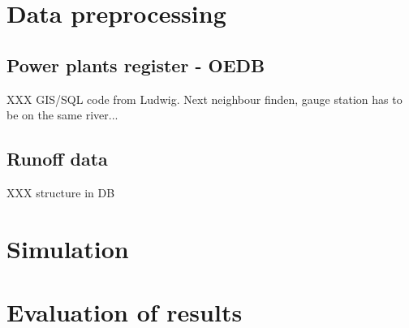\section{Data preprocessing}

\subsection{Power plants register - OEDB}
XXX GIS/SQL code from Ludwig. Next neighbour finden, gauge station has to be on the same river...
\subsection{Runoff data}
XXX structure in DB

\section{Simulation}

\section{Evaluation of results}

